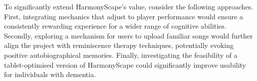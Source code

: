 \documentclass{l4proj}
\begin{document}
To significantly extend HarmonyScape's value, consider the following approaches. First, integrating mechanics that adjust to player performance would ensure a consistently rewarding experience for a wider range of cognitive abilities. Secondly, exploring a mechanism for users to upload familiar songs would further align the project with reminiscence therapy techniques, potentially evoking positive autobiographical memories. Finally, investigating the feasibility of a tablet-optimised version of HarmonyScape could significantly improve usability for individuals with dementia.


%
% 
\end{document}
